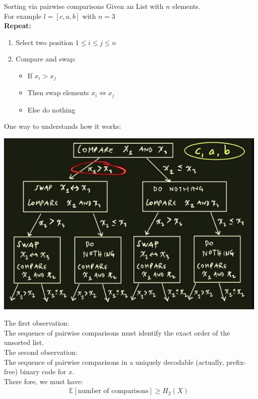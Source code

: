 \begin{parag}{Sorting via pairwise comparisons}
    Given an  List with $n$ elements.
    \\
    For example $l = [c, a, b]$ with $n = 3$
    \\
    \textbf{Repeat:}
    \begin{enumerate}
       \item Select two position $1 \leq i \leq j \leq n$
       \item Compare and swap:
           \begin{itemize}
               \item If $x_i > x_j$
               \item Then swap elements $ x_i \iff x_j$
               \item Else do nothing
           \end{itemize}
    \end{enumerate}
    One way to understands how it works:
\begin{center}
    \includegraphics[scale=0.7]{22025-03-11.png}
\end{center}
The first observation:\\
The sequence of pairwise comparisons must identify the exact order of the unsorted list.
\\
The second observation:\\
The sequence of pairwise comparisons in a uniquely decodable (actually, prefix-free) binary code for $x$.\\
There fore, we must have:
\begin{align*}
    \mathbb{E}[ \text{number of comparisons}] \geq H_2(X)
\end{align*}

\end{parag}
